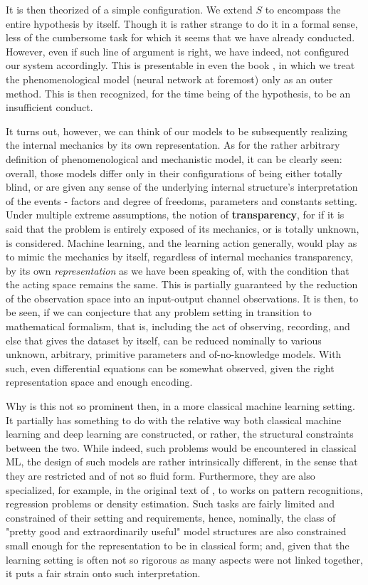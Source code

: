 It is then theorized of a simple configuration. We extend $S$ to encompass the entire hypothesis by itself. Though it is rather strange to do it in a formal sense, less of the cumbersome task for which it seems that we have already conducted. However, even if such line of argument is right, we have indeed, not configured our system accordingly. This is presentable in even the book \cite{VeltenetalMathematicalModelling}, in which we treat the phenomenological model (neural network at foremost) only as an outer method. This is then recognized, for the time being of the hypothesis, to be an insufficient conduct. 

It turns out, however, we can think of our models to be subsequently realizing the internal mechanics by its own representation. As for the rather arbitrary definition of phenomenological and mechanistic model, it can be clearly seen: overall, those models differ only in their configurations of being either totally blind, or are given any sense of the underlying internal structure's interpretation of the events - factors and degree of freedoms, parameters and constants setting. Under multiple extreme assumptions, the notion of \textbf{transparency}, for if it is said that the problem is entirely exposed of its mechanics, or is totally unknown, is considered. Machine learning, and the learning action generally, would play as to mimic the mechanics by itself, regardless of internal mechanics transparency, by its own \textit{representation} as we have been speaking of, with the condition that the acting space remains the same. This is partially guaranteed by the reduction of the observation space into an input-output channel observations. It is then, to be seen, if we can conjecture that any problem setting in transition to mathematical formalism, that is, including the act of observing, recording, and else that gives the dataset by itself, can be reduced nominally to various unknown, arbitrary, primitive parameters and of-no-knowledge models. With such, even differential equations can be somewhat observed, given the right representation space and enough encoding. 

Why is this not so prominent then, in a more classical machine learning setting. It partially has something to do with the relative way both classical machine learning and deep learning are constructed, or rather, the structural constraints between the two. While indeed, such problems would be encountered in classical ML, the design of such models are rather intrinsically different, in the sense that they are restricted and of not so fluid form. Furthermore, they are also specialized, for example, in the original text of \cite{Vapnik1999-VAPTNO}, to works on pattern recognitions, regression problems or density estimation. Such tasks are fairly limited and constrained of their setting and requirements, hence, nominally, the class of "pretty good and extraordinarily useful" model structures are also constrained small enough for the representation to be in classical form; and, given that the learning setting is often not so rigorous as many aspects were not linked together, it puts a fair strain onto such interpretation. 

